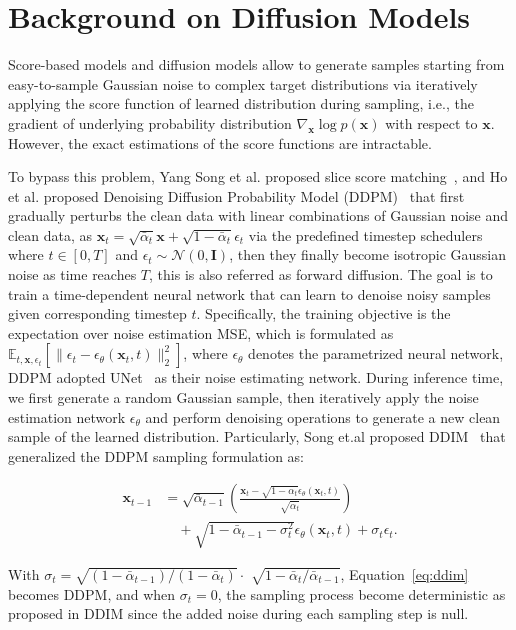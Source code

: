 \section{Background on Diffusion Models}

Score-based models and diffusion models allow to generate samples starting from easy-to-sample Gaussian noise to complex target distributions via
iteratively applying the score function of learned distribution during sampling, i.e., the gradient of underlying probability distribution $\nabla_{\mathbf{x}} \log p(\mathbf{x})$ with respect to $\mathbf{x}$. However, the exact estimations of the score functions are intractable. 

To bypass this problem, Yang Song et al. proposed slice score matching~\cite{song2020sliced}, and Ho et al. proposed Denoising Diffusion Probability Model (DDPM)~\cite{ho2020denoising} that first gradually perturbs the clean data with linear combinations of Gaussian noise and clean data, as $\mathbf{x}_t = \sqrt{\bar{\alpha}_t} \mathbf{x} + \sqrt{1 - \bar{\alpha}_t} \epsilon_t$ via the predefined timestep schedulers where $t \in[0, T]$ and $\epsilon_t \sim \mathcal{N}(0, \mathbf{I})$, then they finally become isotropic Gaussian noise as time reaches $T$, this is also referred as forward diffusion. The goal is to train a time-dependent neural network that can learn to denoise noisy samples given corresponding timestep $t$. Specifically, the training objective is the expectation over noise estimation MSE, which is formulated as $\mathbb{E}_{t, \mathbf{x}, \epsilon_t}[\| \epsilon_t - \epsilon_{\theta}(\mathbf{x}_t, t) \|_2^2]$, where $\epsilon_{\theta}$ denotes the parametrized neural network, DDPM adopted UNet~\cite{ronneberger2015u} as their noise estimating network. During inference time, we first generate a random Gaussian sample, then iteratively apply the noise estimation network $\epsilon_{\theta}$ and perform denoising operations to generate a new clean sample of the learned distribution. Particularly, Song et.al proposed DDIM~\cite{song2021denoisingdiffusionimplicitmodels} that generalized the DDPM sampling formulation as:

\begin{equation}
    \begin{aligned}
        \mathbf{x}_{t-1} &= \sqrt{\bar{\alpha}_{t - 1}}
        \left(\frac {\mathbf{x}_t - \sqrt{1- \bar{\alpha}_t}\epsilon_{\theta}(\mathbf{x}_t, t)}{\sqrt{\bar{\alpha}_t}}
        \right) \\
        &\quad + \sqrt{1-\bar{\alpha}_{t-1}-\sigma^{2}_t}\epsilon_{\theta}(\mathbf{x}_t, t) + \sigma_t \epsilon_t.
    \end{aligned}
    \label{eq:ddim}
\end{equation}

With $\sigma_t = \sqrt{(1-\bar{\alpha}_{t-1})/(1-\bar{\alpha}_t)} \cdot$ $\sqrt{1-\bar{\alpha}_t /\bar{\alpha}_{t-1} }$, Equation~\ref{eq:ddim} becomes DDPM, and when $\sigma_t = 0$, the sampling process become deterministic as proposed in DDIM since the added noise during each sampling step is null.
